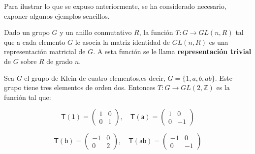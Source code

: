 Para ilustrar lo que se expuso anteriormente, se ha considerado necesario, exponer algunos ejemplos sencillos.

\begin{ejemplo}
Dado un grupo $G$ y un anillo conmutativo $R$, la función $T \colon G \to GL(n,R)$ tal que a cada elemento $G$ le asocia la matriz identidad de $GL(n,R)$ es una representación matricial de $G$. A esta función  se le llama \textbf{representación trivial} de $G$ sobre $R$ de grado $n$. 
\end{ejemplo}


\begin{ejemplo}
Sea $G$ el grupo de Klein de cuatro elementos,es decir, $G = \{ 1, a, b, ab\}$. Este grupo tiene tres elementos de orden dos. Entonces $T \colon G \to GL(2, \mathds{Z})$ es la función tal que:

\[ \mathsf{T(1)} = \begin{pmatrix}
1 & 0 \\
0 & 1
\end{pmatrix}, \quad \mathsf{T(a)} = \begin{pmatrix}
1 & 0 \\
0 & -1
\end{pmatrix} \]

\[ \mathsf{T(b)} = \begin{pmatrix}
-1 & 0 \\
0 & 2
\end{pmatrix}, \quad \mathsf{T(ab)} = \begin{pmatrix}
-1 & 0 \\
0 & -1
\end{pmatrix} \]
\end{ejemplo}

